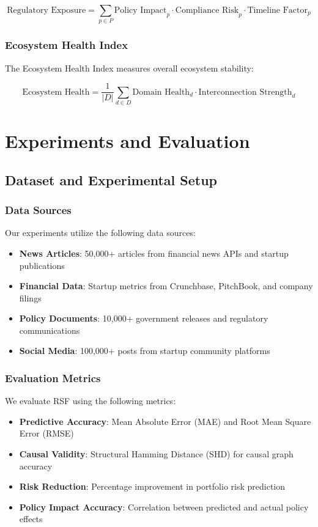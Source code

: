 \documentclass[conference]{IEEEtran}
\begin{document}
\begin{equation}
\text{Regulatory Exposure} = \sum_{p \in P} \text{Policy Impact}_p \cdot \text{Compliance Risk}_p \cdot \text{Timeline Factor}_p
\end{equation}

\subsubsection{Ecosystem Health Index}
The Ecosystem Health Index measures overall ecosystem stability:

\begin{equation}
\text{Ecosystem Health} = \frac{1}{|D|} \sum_{d \in D} \text{Domain Health}_d \cdot \text{Interconnection Strength}_d
\end{equation}

\section{Experiments and Evaluation}

\subsection{Dataset and Experimental Setup}

\subsubsection{Data Sources}
Our experiments utilize the following data sources:
\begin{itemize}
    \item \textbf{News Articles}: 50,000+ articles from financial news APIs and startup publications
    \item \textbf{Financial Data}: Startup metrics from Crunchbase, PitchBook, and company filings
    \item \textbf{Policy Documents}: 10,000+ government releases and regulatory communications
    \item \textbf{Social Media}: 100,000+ posts from startup community platforms
\end{itemize}

\subsubsection{Evaluation Metrics}
We evaluate RSF using the following metrics:
\begin{itemize}
    \item \textbf{Predictive Accuracy}: Mean Absolute Error (MAE) and Root Mean Square Error (RMSE)
    \item \textbf{Causal Validity}: Structural Hamming Distance (SHD) for causal graph accuracy
    \item \textbf{Risk Reduction}: Percentage improvement in portfolio risk prediction
    \item \textbf{Policy Impact Accuracy}: Correlation between predicted and actual policy effects
\end{itemize}
\end{document}
